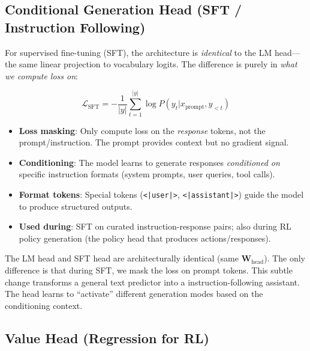 \subsection{Conditional Generation Head (SFT / Instruction Following)}
\label{conditional-generation-head-sft-instruction-following}

For supervised fine-tuning (SFT), the architecture is \emph{identical} to the LM head---the same linear projection to vocabulary logits. The difference is purely in \emph{what we compute loss on}:

\begin{equation}
\mathcal{L}_{\text{SFT}} = -\frac{1}{|y|}\sum_{t=1}^{|y|} \log P(y_t | x_{\text{prompt}}, y_{<t})
\end{equation}

\begin{keybox}
\begin{itemize}
  \item \textbf{Loss masking}: Only compute loss on the \emph{response} tokens, not the prompt/instruction. The prompt provides context but no gradient signal.
  \item \textbf{Conditioning}: The model learns to generate responses \emph{conditioned on} specific instruction formats (system prompts, user queries, tool calls).
  \item \textbf{Format tokens}: Special tokens (\texttt{<|user|>}, \texttt{<|assistant|>}) guide the model to produce structured outputs.
  \item \textbf{Used during}: SFT on curated instruction-response pairs; also during RL policy generation (the policy head that produces actions/responses).
\end{itemize}
\end{keybox}

\begin{intuitionbox}
The LM head and SFT head are architecturally identical (same $\mathbf{W}_{\text{head}}$). The only difference is that during SFT, we mask the loss on prompt tokens. This subtle change transforms a general text predictor into a instruction-following assistant. The head learns to ``activate'' different generation modes based on the conditioning context.
\end{intuitionbox}

\subsection{Value Head (Regression for RL)}
\label{value-head-regression-for-rl}

